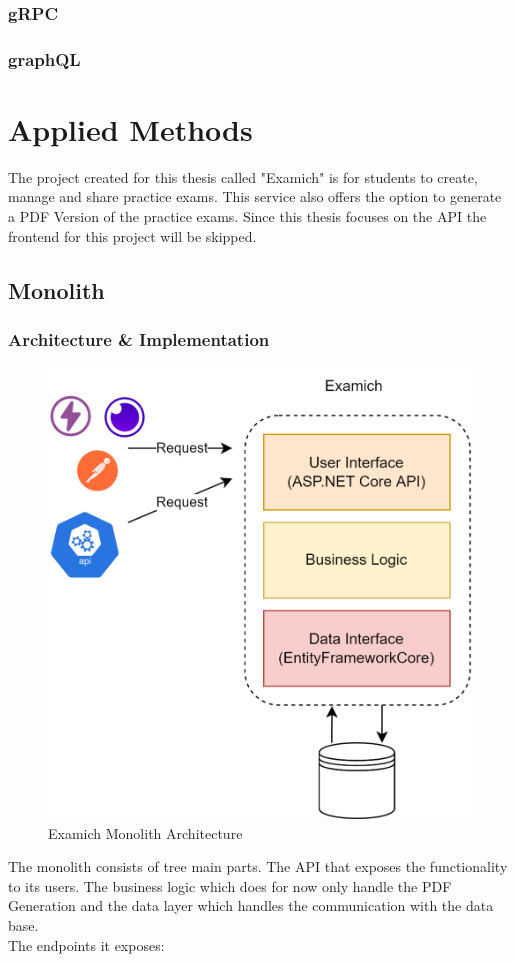 \documentclass[MMR,Master,nenglish]{twbook}%
\begin{document}
\subsection{gRPC}
\subsection{graphQL}

\clearpage
\chapter{Applied Methods}
The project created for this thesis called "Examich" is for students to create, manage and share practice exams. This service also offers the option to generate a PDF Version of the practice exams. Since this thesis focuses on the API the frontend for this project will be skipped.

\section{Monolith}

\subsection{Architecture \& Implementation}

\begin{figure} [H]
 \begin{center}
    \includegraphics[width=0.6\linewidth]{img/ExamichMonolith.png}
 \end{center}
 \caption{Examich Monolith Architecture}
 \label{examichMonolith}
\end{figure}

The monolith consists of tree main parts. The API that exposes the functionality to its users. The business logic which does for now only handle the PDF Generation and the data layer which handles the communication with the data base.
\\
\noindent
The endpoints it exposes:
\end{document}
